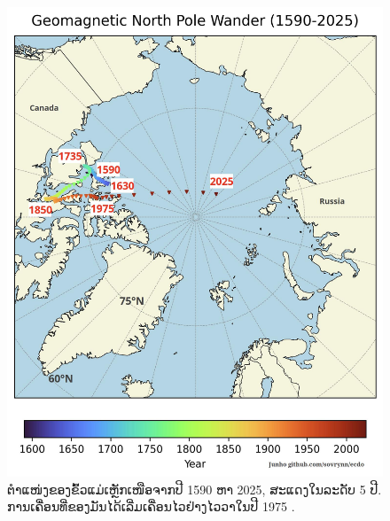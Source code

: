 \documentclass[10pt,twocolumn,letterpaper]{article}
\begin{document}
\begin{figure}[t]
\begin{center}
   \includegraphics[width=1\linewidth]{npw.jpg}
\end{center}
   \caption{ຕຳແໜ່ງຂອງຂົ້ວແມ່ເຫຼັກເໜືອຈາກປີ 1590 ຫາ 2025, ສະແດງໃນລະດັບ 5 ປີ. ການເຄື່ອນທີ່ຂອງມັນໄດ້ເລີ່ມເຄື່ອນໄວຢ່າງໄວວາໃນປີ 1975 \cite{41}.}
\label{fig:13}
\label{fig:onecol}
\end{figure}
\end{document}
